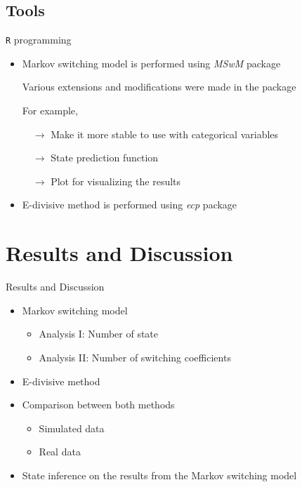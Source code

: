 \documentclass{beamer}
\begin{document}
\begin{frame}[fragile]
\begin{columns}[c]

\end{columns}

\end{frame}
\subsection{Tools}
\begin{frame}
\texttt{R} programming

\begin{itemize}
\item Markov switching model is performed using \textit{MSwM} package \cite{p2}

Various extensions and modifications were made in the package

For example, 

$\quad \rightarrow$ Make it more stable to use with categorical variables

$\quad \rightarrow$ State prediction function

$\quad \rightarrow$ Plot for visualizing the results

\item E-divisive method is performed using \textit{ecp} package \cite{p3}
\end{itemize}

\end{frame}

\section{Results and Discussion}

\begin{frame}
Results and Discussion

\begin{itemize}
\item Markov switching model
\begin{itemize}
\item Analysis I: Number of state
\item Analysis II: Number of switching coefficients
\end{itemize}

\item E-divisive method
\item Comparison between both methods
\begin{itemize}
\item Simulated data
\item Real data
\end{itemize}

\item State inference on the results from the Markov switching model
\end{itemize}

\end{frame}
\end{document}
